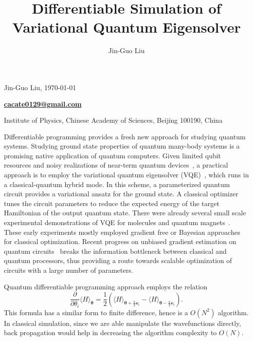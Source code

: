 \documentclass[aps,longbibliography,english,superscriptaddress,prx]{revtex4-1}
\makeatletter
\newcommand{\<}{\langle}
\renewcommand{\>}{\rangle}
\newcommand{\vtheta}{{\boldsymbol{\theta}}}
\renewcommand\maketitle{
\begin{center}
    \phantom{.}
    \vspace{1cm}
    {\Large \bf \@title\par}
    \vspace{0.7cm}
    {Jin-Guo Liu, \;\;\today\par}
    \vspace{0.1cm}
    {\bf \href{mailto:cacate0129@gmail.com}{cacate0129@gmail.com}\par}
    \vspace{0.3cm}
    {Institute of Physics, Chinese Academy of Sciences, Beijing 100190, China}
\end{center}
}
\makeatother
\begin{document}
\title{Differentiable Simulation of Variational Quantum Eigensolver}
\author{Jin-Guo Liu}
\maketitle
\vspace{0.5cm}

\newpage

Differentiable programming provides a fresh new approach for studying quantum systems.
Studying ground state properties of quantum many-body systems is a promising native application of quantum computers. Given limited qubit resources and noisy realizations of near-term quantum  devices~\cite{Preskill2018, Boixo2018}, a practical approach is to employ the variational quantum eigensolver (VQE)~\cite{Peruzzo2014, Jarrod2016, Wecker2015a, Wecker2015b, McArdle2018, Cao2018, Liu2019}, which runs in a classical-quantum hybrid mode.
In this scheme, a parameterized quantum circuit provides a variational ansatz for the ground state. A classical optimizer tunes the circuit parameters to reduce the expected energy of the target Hamiltonian of the output quantum state. There were already several small scale experimental demonstrations of VQE for molecules and quantum magnets~\cite{Shen2017, OMalley2016, Kandala2017,Colless2018, Hempel2018}. These early experiments mostly employed gradient free or Bayesian approaches for classical optimization. Recent progress on unbiased gradient estimation on quantum circuits~\cite{Li2017a, Mitarai2018, Liu2018, Verdon2018, Schuld2018, Javier2018, Bergholm2018, Guerreschi2017,Farhi2018,Romero2018,Harrow2019,Dallaire2018} breaks the information bottleneck between classical and quantum processors, thus
providing a route towards scalable optimization of circuits with a large number of parameters.

Quantum differentiable programming approach employs the relation~\cite{Mitarai2018}
\begin{equation}\label{eq-grad}
    \frac \partial{\partial \theta_i}\<H\>_{\vtheta} = \frac 1 2\left( \langle {H} \rangle_{\vtheta+ \frac \pi 2 \boldsymbol{e}_i} - \langle {H} \rangle_{\vtheta- \frac \pi 2 \boldsymbol{e}_i}\right).
\end{equation}
This formula has a similar form to finite difference, hence is a $O(N^2)$ algorithm. In classical simulation, since we are able manipulate the wavefunctions directly, back propagation would help in decreasing the algorithm complexity to $O(N)$.
\end{document}
